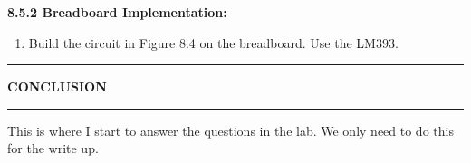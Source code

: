 \documentclass{article}
\begin{document}
\textbf{8.5.2 Breadboard Implementation:}
\begin{enumerate}
    \item Build the circuit in Figure 8.4 on the breadboard. Use the LM393.
\end{enumerate}
\pagebreak
\begin{center}
    \hrule
    \vspace{0.2cm}
    \textbf{\large CONCLUSION}
    \vspace{0.2cm}
    \hrule
\end{center}

This is where I start to answer the questions in the lab. We only need to do this for the write up.
\end{document}
